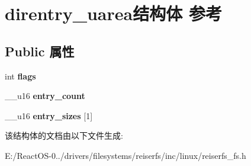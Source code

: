 \hypertarget{structdirentry__uarea}{}\section{direntry\+\_\+uarea结构体 参考}
\label{structdirentry__uarea}
\subsection*{Public 属性}
\begin{DoxyCompactItemize}
\item 
\mbox{\label{structdirentry__uarea_a9a857bdeca38dca2366ad43a9bac8499}} 
int {\bfseries flags}
\item 
\mbox{\label{structdirentry__uarea_a3bf9aa6e64e8ef4e79bac40c5eac675b}} 
\+\_\+\+\_\+u16 {\bfseries entry\+\_\+count}
\item 
\mbox{\label{structdirentry__uarea_aa398cb7acceb82d98abc8dd1333ac8cc}} 
\+\_\+\+\_\+u16 {\bfseries entry\+\_\+sizes} \mbox{[}1\mbox{]}
\end{DoxyCompactItemize}


该结构体的文档由以下文件生成\+:\begin{DoxyCompactItemize}
\item 
E\+:/\+React\+O\+S-\/0../drivers/filesystems/reiserfs/inc/linux/reiserfs\+\_\+fs.\+h\end{DoxyCompactItemize}
